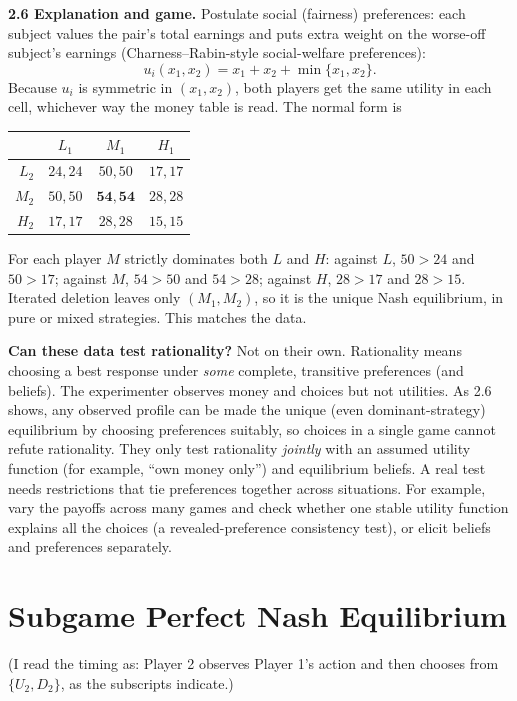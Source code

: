 \documentclass[11pt]{article}
\begin{document}
\textbf{2.6 Explanation and game.} Postulate social (fairness) preferences: each subject values the pair's total earnings and puts extra weight on the worse-off subject's earnings (Charness--Rabin-style social-welfare preferences):
\[
u_i(x_1,x_2)=x_1+x_2+\min\{x_1,x_2\}.
\]
Because $u_i$ is symmetric in $(x_1,x_2)$, both players get the same utility in each cell, whichever way the money table is read. The normal form is
\begin{center}
\begin{tabular}{r|ccc}
 & $L_1$ & $M_1$ & $H_1$ \\ \hline
$L_2$ & $24,24$ & $50,50$ & $17,17$ \\
$M_2$ & $50,50$ & $\mathbf{54,54}$ & $28,28$ \\
$H_2$ & $17,17$ & $28,28$ & $15,15$
\end{tabular}
\end{center}
For each player $M$ strictly dominates both $L$ and $H$: against $L$, $50>24$ and $50>17$; against $M$, $54>50$ and $54>28$; against $H$, $28>17$ and $28>15$. Iterated deletion leaves only $(M_1,M_2)$, so it is the unique Nash equilibrium, in pure or mixed strategies. This matches the data.

\textbf{Can these data test rationality?} Not on their own. Rationality means choosing a best response under \emph{some} complete, transitive preferences (and beliefs). The experimenter observes money and choices but not utilities. As 2.6 shows, any observed profile can be made the unique (even dominant-strategy) equilibrium by choosing preferences suitably, so choices in a single game cannot refute rationality. They only test rationality \emph{jointly} with an assumed utility function (for example, ``own money only'') and equilibrium beliefs. A real test needs restrictions that tie preferences together across situations. For example, vary the payoffs across many games and check whether one stable utility function explains all the choices (a revealed-preference consistency test), or elicit beliefs and preferences separately.

\section{Subgame Perfect Nash Equilibrium}

(I read the timing as: Player 2 observes Player 1's action and then chooses from $\{U_2,D_2\}$, as the subscripts indicate.)
\end{document}
